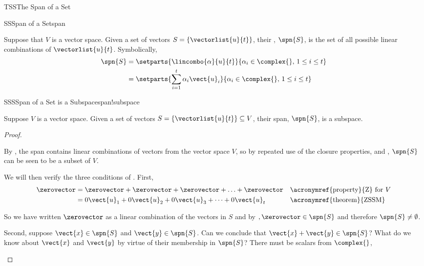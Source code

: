 \begin{subsect}{TSS}{The Span of a Set}
%
\begin{definition}{SS}{Span of a Set}{span}
\begin{para}Suppose that $V$ is a vector space.
Given a set of vectors $S=\{\vectorlist{u}{t}\}$, their , $\spn{S}$, is the set of all possible linear combinations of $\vectorlist{u}{t}$.  Symbolically,
%
\begin{align*}
\spn{S}&=\setparts{\lincombo{\alpha}{u}{t}}{\alpha_i\in\complex{\null},\,1\leq i\leq t}\\
&=\setparts{\sum_{i=1}^{t}\alpha_i\vect{u}_i}{\alpha_i\in\complex{\null},\,1\leq i\leq t}
\end{align*}
\end{para}
%
\end{definition}
%
\begin{theorem}{SSS}{Span of a Set is a Subspace}{span!subspace}
\begin{para}Suppose $V$ is a vector space.  Given a set of vectors $S=\{\vectorlist{u}{t}\}\subseteq V$, their span, $\spn{S}$, is a subspace.\end{para}
\end{theorem}
%
\begin{proof}
\begin{para}By , the span contains linear combinations of vectors from the vector space $V$, so by repeated use of the closure properties,  and , $\spn{S}$ can be seen to be a subset of $V$.\end{para}
%
\begin{para}We will then verify the three conditions of .  First,
%
\begin{align*}
\zerovector
&=\zerovector+\zerovector+\zerovector+\ldots+\zerovector&&\text{\acronymref{property}{Z} for $V$}\\
&=0\vect{u}_1+0\vect{u}_2+0\vect{u}_3+\cdots+0\vect{u}_t&&\text{\acronymref{theorem}{ZSSM}}
\end{align*}
\end{para}
%
\begin{para}So we have written $\zerovector$ as a linear combination of the vectors in $S$ and by $, \zerovector\in\spn{S}$ and therefore $\spn{S}\neq\emptyset$.\end{para}
%
\begin{para}Second, suppose $\vect{x}\in\spn{S}$ and $\vect{y}\in\spn{S}$.  Can we conclude that $\vect{x}+\vect{y}\in\spn{S}$?  What do we know about $\vect{x}$ and $\vect{y}$ by virtue of their membership in $\spn{S}$?  There must be scalars from $\complex{\null}$,

\end{para}
\end{proof}
\end{subsect}
